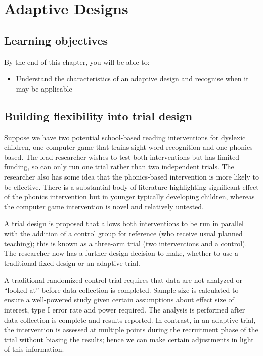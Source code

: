 \documentclass{krantz}
\providecommand{\tightlist}{%
\setlength{\itemsep}{0pt}\setlength{\parskip}{0pt}}
\begin{document}
\hypertarget{adaptive}{%
\chapter{Adaptive Designs}\label{adaptive}}

\hypertarget{learning-objectives-14}{%
\section{Learning objectives}\label{learning-objectives-14}}

By the end of this chapter, you will be able to:

\begin{itemize}
\tightlist
\item
  Understand the characteristics of an adaptive design and recognise when it may be applicable
\end{itemize}

\hypertarget{building-flexibility-into-trial-design}{%
\section{Building flexibility into trial design}\label{building-flexibility-into-trial-design}}

Suppose we have two potential school-based reading interventions for dyslexic children, one computer game that trains sight word recognition and one phonics-based. The lead researcher wishes to test both interventions but has limited funding, so can only run one trial rather than two independent trials. The researcher also has some idea that the phonics-based intervention is more likely to be effective. There is a substantial body of literature highlighting significant effect of the phonics intervention but in younger typically developing children, whereas the computer game intervention is novel and relatively untested.

A trial design is proposed that allows both interventions to be run in parallel with the addition of a control group for reference (who receive usual planned teaching); this is known as a three-arm trial (two interventions and a control). The researcher now has a further design decision to make, whether to use a traditional fixed design or an adaptive trial.

A traditional randomized control trial requires that data are not analyzed or ``looked at'' before data collection is completed. Sample size is calculated to ensure a well-powered study given certain assumptions about effect size of interest, type I error rate and power required. The analysis is performed after data collection is complete and results reported. In contrast, in an adaptive trial, the intervention is assessed at multiple points during the recruitment phase of the trial without biasing the results; hence we can make certain adjustments in light of this information.
\end{document}
